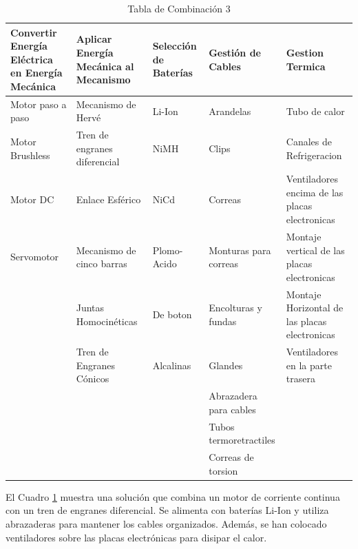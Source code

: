     \begin{table}[H]
    \centering
    \begin{tabularx}{\textwidth}{|X|X|X|X|X|}
    \hline
    \textbf{Convertir Energía Eléctrica en Energía Mecánica} & \textbf{Aplicar Energía Mecánica al Mecanismo} & \textbf{Selección de Baterías} & \textbf{Gestión de Cables} & \textbf{Gestion Termica} \\
    \hline
    Motor paso a paso & Mecanismo de Hervé & \cellcolor{green}Li-Ion  & Arandelas & Tubo de calor\\
    \hline
    Motor Brushless & \cellcolor{green}Tren de engranes diferencial & NiMH & Clips & Canales de Refrigeracion \\
    \hline
    \cellcolor{green}Motor DC & Enlace Esférico & NiCd & Correas & \cellcolor{green}Ventiladores encima de las placas electronicas\\
    \hline
    Servomotor & Mecanismo de cinco barras & Plomo-Acido & Monturas para correas & Montaje vertical de las placas electronicas\\
    \hline
     & Juntas Homocinéticas & De boton & Encolturas y fundas & Montaje Horizontal de las placas electronicas\\
    \hline
     & Tren de Engranes Cónicos & Alcalinas & Glandes & Ventiladores en la parte trasera\\
    \hline
     & & & \cellcolor{green}Abrazadera para cables & \\
    \hline
     & & & Tubos termoretractiles & \\
    \hline
     & & & Correas de torsion & \\
    \hline
    \end{tabularx}
    \caption{Tabla de Combinación 3}
    \label{tab:combinacion_3}
    \end{table}    

    El Cuadro \ref{tab:combinacion_3} muestra una solución que combina un motor de corriente continua con un tren de engranes diferencial. Se alimenta con baterías Li-Ion y utiliza abrazaderas para mantener los cables organizados. Además, se han colocado ventiladores sobre las placas electrónicas para disipar el calor.

